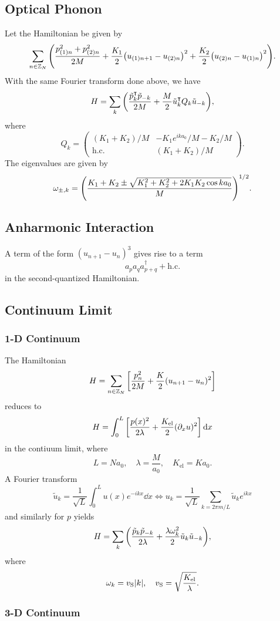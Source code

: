 \documentclass{article}
\begin{document}
\subsection{Optical Phonon}

Let the Hamiltonian be given by
\[ \sum_{n\in\mathbb{Z}_N} \qty(\frac{p_{(1)n}^2 + p_{(2)n}^2}{2M} + \frac{K_1}{2}\qty(u_{(1)n+1} - u_{(2)n})^2 + \frac{K_2}{2}\qty(u_{(2)n} - u_{(1)n})^2). \]
With the same Fourier transform done above, we have
\[ H = \sum_k \qty(\frac{\tilde{p}^\intercal_k \tilde{p}_{-k}}{2M} + \frac{M}{2} \tilde{u}^\intercal_k Q_k \tilde{u}_{-k}), \]
where
\[ Q_{k} = \begin{pmatrix}
    (K_1 + K_2)/M & -K_1 e^{ika_0}/M - K_2/M \\ \mathrm{h.c.} & (K_1 + K_2) / M
\end{pmatrix}. \]
The eigenvalues are given by
\[ \omega_{\pm,k} = \qty(\frac{K_1 + K_2 \pm \sqrt{K_1^2 + K_2^2 + 2K_1K_2 \cos k a_0}}{M})^{1/2}. \]

\subsection{Anharmonic Interaction}

A term of the form $(u_{n+1} - u_n)^3$ gives rise to a term
\[ a_{p} a_{q} a^\dagger_{p+q} + \mathrm{h.c.} \]
in the second-quantized Hamiltonian.

\subsection{Continuum Limit}

\subsubsection{1-D Continuum}

The Hamiltonian
\[ H = \sum_{n\in \mathbb{Z}_N} \qty[\frac{p_n^2}{2M} + \frac{K}{2}(u_{n+1} - u_n)^2] \]
reduces to
\[ H = \int_0^L \qty[\frac{p(x)^2}{2\lambda} + \frac{K_{\mathrm{el}}}{2}(\partial_x u)^2] \dd{x} \]
in the contiuum limit, where
\[ L = Na_0, \quad \lambda = \frac{M}{a_0},\quad K_{\mathrm{el}} = Ka_0. \]
A Fourier transform
\[ \tilde{u}_k = \frac{1}{\sqrt{L}}\int_0^L u(x) e^{-ikx}\dd{x} \Leftrightarrow u_k = \frac{1}{\sqrt{L}} \sum_{k=2\pi m/L} \tilde{u}_k e^{ikx} \]
and similarly for $p$ yields
\[ H = \sum_k \qty(\frac{\tilde{p}_k \tilde{p}_{-k}}{2\lambda} + \frac{\lambda\omega_k^2}{2}\tilde{u}_k \tilde{u}_{-k}), \]
where
\[ \omega_k = v_{\mathrm{S}}\abs{k},\quad v_{\mathrm{S}} = \sqrt{\frac{K_{\mathrm{el}}}{\lambda}}. \]

\subsubsection{3-D Continuum}



% 
% 
\end{document}
